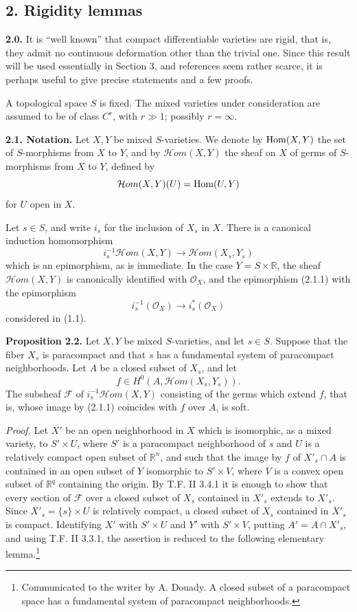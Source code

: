 \documentclass[11pt]{article}
\begin{document}
\subsection*{2. Rigidity lemmas}

\textbf{2.0.} It is ``well known'' that compact differentiable varieties are rigid, that is, they admit no continuous deformation other than the trivial one. Since this result will be used essentially in Section 3, and references seem rather scarce, it is perhaps useful to give precise statements and a few proofs.

A topological space $S$ is fixed. The mixed varieties under consideration are assumed to be of class $C^r$, with $r\gg1$; possibly $r=\infty$.

\textbf{2.1. Notation.} Let $X,Y$ be mixed $S$-varieties. We denote by $\operatorname{Hom}(X,Y)$ the set of $S$-morphisms from $X$ to $Y$, and by $\mathcal Hom(X,Y)$ the sheaf on $X$ of germs of $S$-morphisms from $X$ to $Y$, defined by
\[
 \mathcal Hom(X,Y)(U)=\operatorname{Hom}(U,Y)
\]
for $U$ open in $X$.

Let $s\in S$, and write $i_s$ for the inclusion of $X_s$ in $X$. There is a canonical induction homomorphism
\begin{equation}\tag{2.1.1}
 i_s^{-1}\mathcal Hom(X,Y)\longrightarrow \mathcal Hom(X_s,Y_s)
\end{equation}
which is an epimorphism, as is immediate. In the case $Y=S\times\mathbb R$, the sheaf $\mathcal Hom(X,Y)$ is canonically identified with $\mathcal O_X$, and the epimorphism (2.1.1) with the epimorphism
\[
 i_s^{-1}(\mathcal O_X)\longrightarrow i_s^*(\mathcal O_X)
\]
considered in (1.1).

\textbf{Proposition 2.2.} Let $X,Y$ be mixed $S$-varieties, and let $s\in S$. Suppose that the fiber $X_s$ is paracompact and that $s$ has a fundamental system of paracompact neighborhoods. Let $A$ be a closed subset of $X_s$, and let
\[
 f\in H^0(A,\mathcal Hom(X_s,Y_s)).
\]
The subsheaf $\mathcal F$ of $i_s^{-1}\mathcal Hom(X,Y)$ consisting of the germs which extend $f$, that is, whose image by (2.1.1) coincides with $f$ over $A$, is soft.

\emph{Proof.} Let $X'$ be an open neighborhood in $X$ which is isomorphic, as a mixed variety, to $S'\times U$, where $S'$ is a paracompact neighborhood of $s$ and $U$ is a relatively compact open subset of $\mathbb R^n$, and such that the image by $f$ of $X'_s\cap A$ is contained in an open subset of $Y$ isomorphic to $S'\times V$, where $V$ is a convex open subset of $\mathbb R^q$ containing the origin. By T.F. II 3.4.1 it is enough to show that every section of $\mathcal F$ over a closed subset of $X_s$ contained in $X'_s$ extends to $X'_s$. Since $X'_s=\{s\}\times U$ is relatively compact, a closed subset of $X_s$ contained in $X'_s$ is compact. Identifying $X'$ with $S'\times U$ and $Y'$ with $S'\times V$, putting $A'=A\cap X'_s$, and using T.F. II 3.3.1, the assertion is reduced to the following elementary lemma.\footnote{Communicated to the writer by A. Douady. A closed subset of a paracompact space has a fundamental system of paracompact neighborhoods.}
\end{document}

